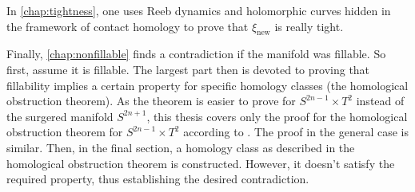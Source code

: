 In \cref{chap:tightness}, one uses Reeb dynamics and holomorphic curves hidden in the framework of contact homology to prove that $\xi_\text{new}$
is really tight.

Finally, \cref{chap:nonfillable} finds a contradiction if the manifold was fillable. So first, assume it is fillable.
The largest part then is devoted to proving that fillability implies a certain property for specific homology classes
(the homological obstruction theorem).
As the theorem is easier to prove for $S^{2n-1} \times T^2$ instead of the surgered manifold $S^{2n+1}$,
this thesis covers only the proof for the homological obstruction theorem for $S^{2n-1} \times T^2$ according to \cite{BGM22}. 
The proof in the general case is similar.
Then, in the final section, a homology class as described in the homological obstruction theorem is constructed.
However, it doesn't satisfy the required property, thus establishing the desired contradiction.